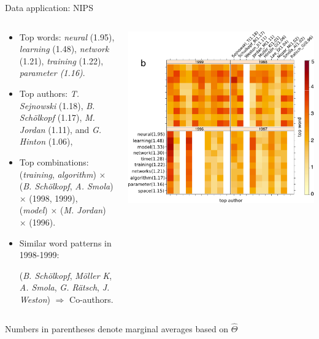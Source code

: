 \documentclass[10pt, mathserif]{beamer} %
\theoremstyle{definition}
\theoremstyle{plain}
\begin{document}
\begin{frame}[label=result]{Data application: NIPS}
\begin{columns}
\begin{column}{0.5\textwidth} 
\scriptsize
\begin{itemize}
\item Top words: \emph{neural} (1.95), \emph{learning} (1.48), \emph{network} (1.21), \emph{training} (1.22), \emph{parameter (1.16)}.
\item Top authors: \emph{T. Sejnowski} (1.18), \emph{B. Sch\"{o}lkopf} (1.17), \emph{M. Jordan} (1.11), and \emph{G. Hinton} (1.06),
\item Top combinations: 
\\(\emph{\color{red}training}, \emph{\color{red}algorithm}) $\times$ (\emph{B. Sch\"{o}lkopf}, \emph{A. Smola}) $\times$ (1998, 1999), \\
(\emph{\color{blue}model}) $\times$ (\emph{M. Jordan}) $\times$ (1996).
\item Similar word patterns in 1998-1999:

(\emph{B. Sch\"{o}lkopf}, \emph{M\"{o}ller K}, \emph{A. Smola}, \emph{G. R\"{a}tsch}, \emph{J. Weston}) {\color{darkgreen}$\Rightarrow$ Co-authors}. 
\end{itemize}
\end{column}

\begin{column}{0.5\textwidth} 
\includegraphics[width=1\textwidth]{Figures/signal.pdf}
\end{column}
\end{columns}

\vspace{1cm}
{\hfill \scriptsize Numbers in parentheses denote marginal averages based on $\hat \Theta$\\
\hfill \hyperlink{NIPS}{}
}
\end{frame}
\end{document}
